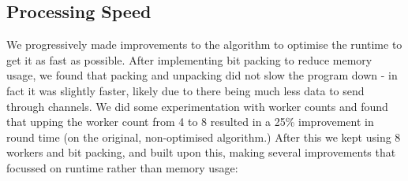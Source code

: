 \documentclass[]{article}
\begin{document}
\subsection{Processing Speed}
We progressively made improvements to the algorithm to optimise the runtime to get it as fast as possible. After implementing bit packing to reduce memory usage, we found that packing and unpacking did not slow the program down - in fact it was slightly faster, likely due to there being much less data to send through channels. We did some experimentation with worker counts and found that upping the worker count from 4 to 8 resulted in a 25\% improvement in round time (on the original, non-optimised algorithm.) After this we kept using 8 workers and bit packing, and built upon this, making several improvements that focussed on runtime rather than memory usage:
\end{document}
